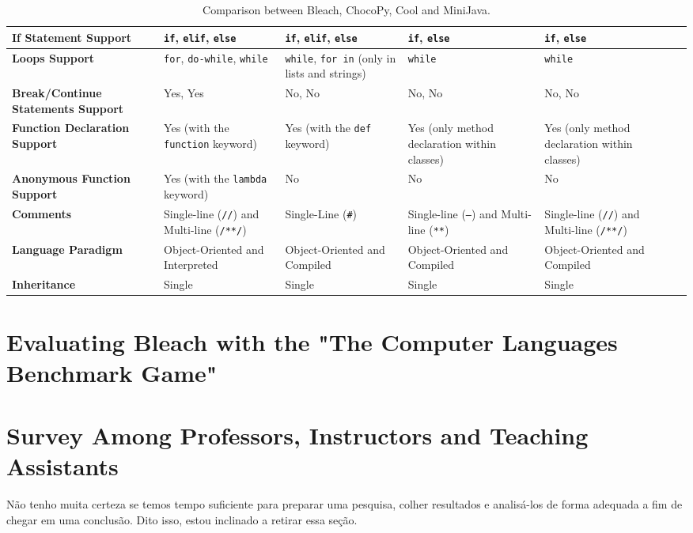 \begin{table}[h!]
\begin{tabular}{|p{3.2cm}|p{3cm}|p{3cm}|p{3cm}|p{3cm}|p{3cm}|}
        \hline
        \textbf{If Statement Support} & \texttt{if}, \texttt{elif}, \texttt{else} & \texttt{if}, \texttt{elif}, \texttt{else} & \texttt{if}, \texttt{else} & \texttt{if}, \texttt{else} \\
        \hline
        \textbf{Loops Support} & \texttt{for}, \texttt{do-while}, \texttt{while} & \texttt{while}, \texttt{for in} (only in lists and strings) & \texttt{while} & \texttt{while} \\
        \hline
        \textbf{Break/Continue Statements Support} & Yes, Yes & No, No & No, No & No, No \\
        \hline
        \textbf{Function Declaration Support} & Yes (with the \texttt{function} keyword) & Yes (with the \texttt{def} keyword) & Yes (only method declaration within classes) & Yes (only method declaration within classes) \\
        \hline
        \textbf{Anonymous Function Support} & Yes (with the \texttt{lambda} keyword) & No & No & No \\
        \hline
        \textbf{Comments} & Single-line (\texttt{//}) and Multi-line (\texttt{/**/}) & Single-Line (\texttt{\#}) & Single-line (\texttt{---}) and Multi-line (\texttt{**}) & Single-line (\texttt{//}) and Multi-line (\texttt{/**/}) \\
        \hline
        \textbf{Language Paradigm} & Object-Oriented and Interpreted & Object-Oriented and Compiled & Object-Oriented and Compiled & Object-Oriented and Compiled \\
        \hline
        \textbf{Inheritance} & Single & Single & Single & Single \\
        \hline
    \end{tabular}
    \caption{Comparison between Bleach, ChocoPy, Cool and MiniJava.}
    \label{tab:example5x5}
\end{table}


\section{Evaluating Bleach with the "The Computer Languages Benchmark Game"}

\section{Survey Among Professors, Instructors and Teaching Assistants}
Não tenho muita certeza se temos tempo suficiente para preparar uma pesquisa, colher resultados e analisá-los de forma adequada a fim de chegar em uma conclusão. Dito isso, estou inclinado a retirar essa seção.